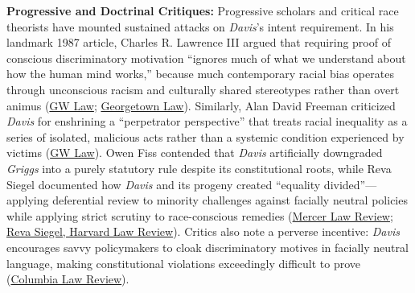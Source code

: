 \documentclass[12pt]{article}
\begin{document}
\textbf{Progressive and Doctrinal Critiques:} Progressive scholars and critical race theorists have mounted sustained attacks on \textit{Davis}'s intent requirement. In his landmark 1987 article, Charles R. Lawrence III argued that requiring proof of conscious discriminatory motivation ``ignores much of what we understand about how the human mind works,'' because much contemporary racial bias operates through unconscious racism and culturally shared stereotypes rather than overt animus (\href{https://scholarship.law.gwu.edu/cgi/viewcontent.cgi?params=/context/faculty_publications/article/2030/&path_info=Was_the_Disparate_Impact_Theory_a_Mistake.pdf}{GW Law}; \href{https://scholarship.law.georgetown.edu/cgi/viewcontent.cgi?article=1340&context=facpub}{Georgetown Law}). Similarly, Alan David Freeman criticized \textit{Davis} for enshrining a ``perpetrator perspective'' that treats racial inequality as a series of isolated, malicious acts rather than a systemic condition experienced by victims (\href{https://scholarship.law.gwu.edu/cgi/viewcontent.cgi?params=/context/faculty_publications/article/2030/&path_info=Was_the_Disparate_Impact_Theory_a_Mistake.pdf}{GW Law}). Owen Fiss contended that \textit{Davis} artificially downgraded \textit{Griggs} into a purely statutory rule despite its constitutional roots, while Reva Siegel documented how \textit{Davis} and its progeny created ``equality divided''---applying deferential review to minority challenges against facially neutral policies while applying strict scrutiny to race-conscious remedies (\href{https://digitalcommons.law.mercer.edu/cgi/viewcontent.cgi?article=1314&context=jour_mlr}{Mercer Law Review}; \href{https://law.yale.edu/sites/default/files/documents/pdf/Faculty/Siegel_TheSupremeCourt2012TermForwardEqualityDivided.pdf}{Reva Siegel, Harvard Law Review}). Critics also note a perverse incentive: \textit{Davis} encourages savvy policymakers to cloak discriminatory motives in facially neutral language, making constitutional violations exceedingly difficult to prove (\href{https://www.columbialawreview.org/content/process-scrutiny-motivational-inquiry-and-constitutional-rights/}{Columbia Law Review}).
\end{document}
